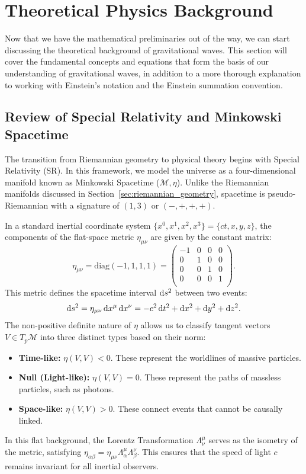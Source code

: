 \section{Theoretical Physics Background}
\label{sec:theoretical_physics_background}

Now that we have the mathematical preliminaries out of the way, we can start discussing the theoretical background of gravitational waves. This section will cover the fundamental concepts and equations that form the basis of our understanding of gravitational waves, in addition to a more thorough explanation to working with Einstein's notation and the Einstein summation convention.

\subsection{Review of Special Relativity and Minkowski Spacetime} The transition from Riemannian geometry to physical theory begins with Special Relativity (SR). In this framework, we model the universe as a four-dimensional manifold known as Minkowski Spacetime ($\mathcal{M}, \eta$). Unlike the Riemannian manifolds discussed in Section~\ref{sec:riemannian_geometry}, spacetime is pseudo-Riemannian with a signature of $(1, 3)$ or $(-, +, +, +)$.

In a standard inertial coordinate system $\{x^0, x^1, x^2, x^3\} = \{ct, x, y, z\}$, the components of the flat-space metric $\eta_{\mu\nu}$ are given by the constant matrix:
\[%
  \eta_{\mu\nu} = \text{diag}(-1, 1, 1, 1) = \begin{pmatrix}
    -1 & 0 & 0 & 0 \\
    0 & 1 & 0 & 0 \\
    0 & 0 & 1 & 0 \\
    0 & 0 & 0 & 1 \\
  \end{pmatrix}
.\]%
This metric defines the spacetime interval $\ds^2$ between two events:
\[%
  \ds^2 = \eta_{\mu\nu} \dx^\mu \dx^\nu = -c^2\dt^2 + \dx^2 + \dy^2 + \dz^2
.\]%
The non-positive definite nature of $\eta$ allows us to classify tangent vectors $V \in T_p\mathcal{M}$ into three distinct types based on their norm:
\begin{itemize}
  \item \textbf{Time-like:} $\eta(V, V) < 0$. These represent the worldlines of massive particles.
  \item \textbf{Null (Light-like):} $\eta(V, V) = 0$. These represent the paths of massless particles, such as photons.
  \item \textbf{Space-like:} $\eta(V, V) > 0$. These connect events that cannot be causally linked.
\end{itemize}
In this flat background, the Lorentz Transformation $\Lambda^\mu_{\nu}$ serves as the isometry of the metric, satisfying $\eta_{\alpha\beta} = \eta_{\mu\nu} \Lambda^\mu_{\alpha} \Lambda^\nu_{\beta}$. This ensures that the speed of light $c$ remains invariant for all inertial observers.

